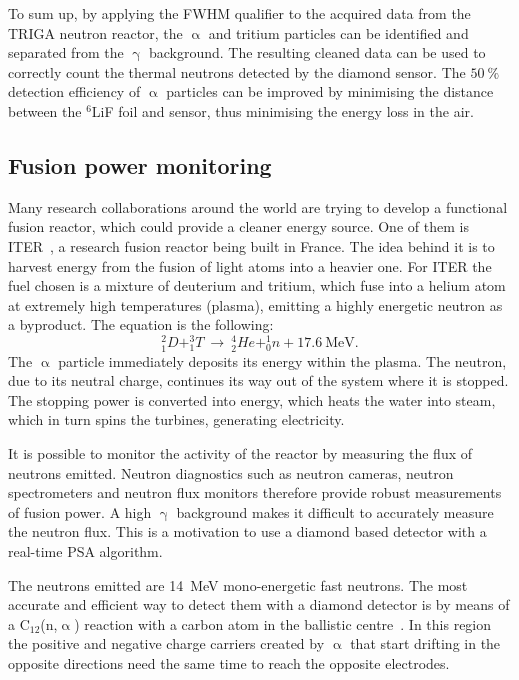 To sum up, by applying the FWHM qualifier to the acquired data from the TRIGA neutron reactor, the $\upalpha$ and tritium particles can be identified and separated from the $\upgamma$ background. The resulting cleaned data can be used to correctly count the thermal neutrons detected by the diamond sensor. The $50~\%$ detection efficiency of $\upalpha$ particles can be improved by minimising the distance between the $^6$LiF foil and sensor, thus minimising the energy loss in the air.










\clearpage
\subsection{Fusion power monitoring}
\label{sec:fusion}
Many research collaborations around the world are trying to develop a functional fusion reactor, which could provide a cleaner energy source. One of them is ITER~\cite{ITER:00000}, a research fusion reactor being built in France. The idea behind it is to harvest energy from the fusion of light atoms into a heavier one. For ITER the fuel chosen is a mixture of deuterium and tritium, which fuse into a helium atom at extremely high temperatures (plasma), emitting a highly energetic neutron as a byproduct. The equation is the following:
\begin{equation}
^2_1D+^3_1T ~\rightarrow~ ^4_2He+^1_0n+17.6~\textrm{MeV}.
\end{equation}
The $\upalpha$ particle immediately deposits its energy within the plasma. The neutron, due to its neutral charge, continues its way out of the system where it is stopped. The stopping power is converted into energy, which heats the water into steam, which in turn spins the turbines, generating electricity.

It is possible to monitor the activity of the reactor by measuring the flux of neutrons emitted. Neutron diagnostics such as neutron cameras, neutron spectrometers and neutron flux monitors therefore provide robust measurements of fusion power. A high $\upgamma$ background makes it difficult to accurately measure the neutron flux. This is a motivation to use a diamond based detector with a real-time PSA algorithm.

The neutrons emitted are 14~MeV mono-energetic fast neutrons. The most accurate and efficient way to detect them with a diamond detector is by means of a C$_\mathrm{12}$(n,$\upalpha$) reaction with a carbon atom in the ballistic centre~\cite{PAVEL:00001}. In this region the positive and negative charge carriers created by $\upalpha$ that start drifting in the opposite directions need the same time to reach the opposite electrodes.

